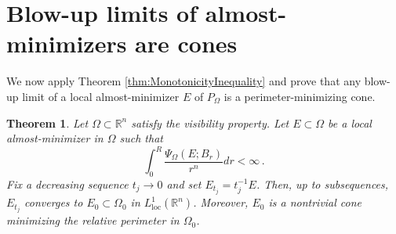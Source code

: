\documentclass[a4paper,reqno,11pt]{amsart}
\newtheorem{theorem}{Theorem}[section]
\newtheorem{lemma}[theorem]{Lemma}
\newcommand{\R}{\mathbb{R}}
\newcommand{\loc}{\mathop{\mathrm{loc}}}
\newcommand{\pr}{P_{\Omega}}
\begin{document}
\section{Blow-up limits of almost-minimizers are cones}
We now apply Theorem \ref{thm:MonotonicityInequality} and prove that any blow-up limit of a local almost-minimizer $E$ of $\pr$ is a perimeter-minimizing cone. 
\begin{theorem} \label{thm:conblowup}
Let $\Omega \subset \R^{n}$ satisfy the visibility property. Let $E \subset \Omega$ be a local almost-minimizer in $\Omega$ such that
\begin{equation*} %
\int_{0}^{R} \dfrac{\Psi_{\Omega}(E;B_r)}{r^n} dr < \infty \, .
\end{equation*}
Fix a decreasing sequence $t_{j} \to 0$ and set $E_{t_{j}} = t_{j}^{-1}E$. Then, up to subsequences, $E_{t_{j}}$ converges to $E_{0} \subset \Omega_{0}$ in $L^{1}_{\loc}(\R^{n})$. Moreover, $E_{0}$ is a nontrivial cone minimizing the relative perimeter in $\Omega_{0}$.
\end{theorem}
\end{document}
